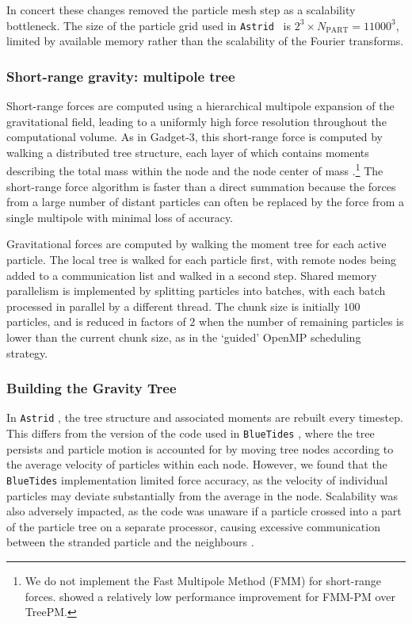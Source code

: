 \documentclass[fleqn,usenatbib]{mnras}
\def\astrid{\texttt{Astrid} }
\def\bluetides{\texttt{BlueTides} }
\begin{document}
In concert these changes removed the particle mesh step as a scalability bottleneck. The size of the particle grid used in \astrid~is $2^3\times N_\mathrm{PART} = 11000^3$, limited by available memory rather than the scalability of the Fourier transforms.

\subsubsection{Short-range gravity: multipole tree}

Short-range forces are computed using a hierarchical multipole expansion of the gravitational field, leading to a uniformly high force resolution throughout the computational volume. As in Gadget-3, this short-range force is computed by walking a distributed tree structure, each layer of which contains moments describing the total mass within the node and the node center of mass \citep{1986Natur.324..446B}.\footnote{We do not implement the Fast Multipole Method (FMM) for short-range forces. \cite{2020arXiv201003567S} showed a relatively low performance improvement for FMM-PM over TreePM.} The short-range force algorithm is faster than a direct summation because the forces from a large number of distant particles can often be replaced by the force from a single multipole with minimal loss of accuracy.

Gravitational forces are computed by walking the moment tree for each active particle. The local tree is walked for each particle first, with remote nodes being added to a communication list and walked in a second step. Shared memory parallelism is implemented by splitting particles into batches, with each batch processed in parallel by a different thread. The chunk size is initially $100$ particles, and is reduced in factors of $2$ when the number of remaining particles is lower than the current chunk size, as in the `guided' OpenMP scheduling strategy.

\subsubsection{Building the Gravity Tree}

In \astrid, the tree structure and associated moments are rebuilt every timestep. This differs from the version of the code used in \bluetides, where the tree persists and particle motion is accounted for by moving tree nodes according to the average velocity of particles within each node. However, we found that the \bluetides implementation limited force accuracy, as the velocity of individual particles may deviate substantially from the average in the node. Scalability was also adversely impacted, as the code was unaware if a particle crossed into a part of the particle tree on a separate processor, causing excessive communication between the stranded particle and the neighbours \citep{Bird:2018}.
\end{document}
